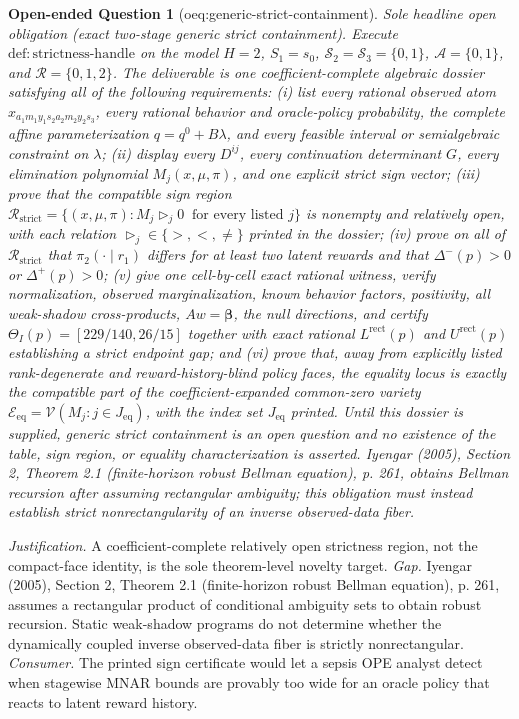 \documentclass{article}
\newtheorem{openendedquestion}{Open-ended Question}
\begin{document}
\begin{openendedquestion}[oeq:generic-strict-containment]\label{oeq:generic-strict-containment}
Sole headline open obligation (exact two-stage generic strict containment). Execute \(\mathrm{def{:}strictness\text{-}handle}\) on the model \(H=2\), \(S_1=s_0\), \(\mathcal S_2=\mathcal S_3=\{0,1\}\), \(\mathcal A=\{0,1\}\), and \(\mathcal R=\{0,1,2\}\). The deliverable is one coefficient-complete algebraic dossier satisfying all of the following requirements: (i) list every rational observed atom \(x_{a_1m_1y_1s_2a_2m_2y_2s_3}\), every rational behavior and oracle-policy probability, the complete affine parameterization \(q=q^0+B\lambda\), and every feasible interval or semialgebraic constraint on \(\lambda\); (ii) display every \(D^{ij}\), every continuation determinant \(G\), every elimination polynomial \(M_j(x,\mu,\pi)\), and one explicit strict sign vector; (iii) prove that the compatible sign region \(\mathcal R_{\mathrm{strict}}=\{(x,\mu,\pi):M_j\mathrel{\triangleright_j}0\ \text{ for every listed }j\}\) is nonempty and relatively open, with each relation \(\triangleright_j\in\{>,<,\ne\}\) printed in the dossier; (iv) prove on all of \(\mathcal R_{\mathrm{strict}}\) that \(\pi_2(\cdot\mid r_1)\) differs for at least two latent rewards and that \(\Delta^-(p)>0\) or \(\Delta^+(p)>0\); (v) give one cell-by-cell exact rational witness, verify normalization, observed marginalization, known behavior factors, positivity, all weak-shadow cross-products, \(A w=\boldsymbol\beta\), the null directions, and certify \(\Theta_I(p)=[229/140,26/15]\) together with exact rational \(L^{\mathrm{rect}}(p)\) and \(U^{\mathrm{rect}}(p)\) establishing a strict endpoint gap; and (vi) prove that, away from explicitly listed rank-degenerate and reward-history-blind policy faces, the equality locus is exactly the compatible part of the coefficient-expanded common-zero variety \(\mathcal E_{\mathrm{eq}}=\mathcal V(M_j:j\in J_{\mathrm{eq}})\), with the index set \(J_{\mathrm{eq}}\) printed. Until this dossier is supplied, generic strict containment is an open question and no existence of the table, sign region, or equality characterization is asserted. Iyengar (2005), Section 2, Theorem 2.1 (finite-horizon robust Bellman equation), p. 261, obtains Bellman recursion after assuming rectangular ambiguity; this obligation must instead establish strict nonrectangularity of an inverse observed-data fiber.
\end{openendedquestion}
\par\smallskip\noindent \textit{Justification.} A coefficient-complete relatively open strictness region, not the compact-face identity, is the sole theorem-level novelty target. \textit{Gap.} Iyengar (2005), Section 2, Theorem 2.1 (finite-horizon robust Bellman equation), p. 261, assumes a rectangular product of conditional ambiguity sets to obtain robust recursion. Static weak-shadow programs do not determine whether the dynamically coupled inverse observed-data fiber is strictly nonrectangular. \textit{Consumer.} The printed sign certificate would let a sepsis OPE analyst detect when stagewise MNAR bounds are provably too wide for an oracle policy that reacts to latent reward history.
\end{document}
